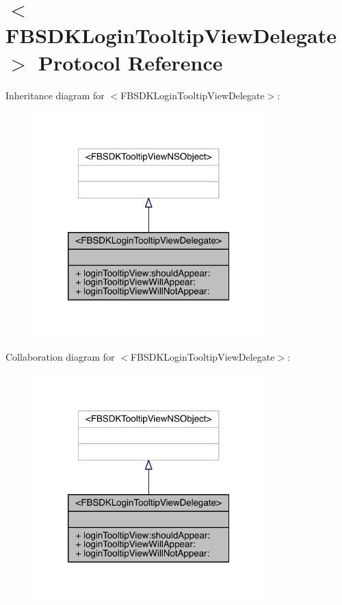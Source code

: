 \hypertarget{protocol_f_b_s_d_k_login_tooltip_view_delegate-p}{\section{$<$F\-B\-S\-D\-K\-Login\-Tooltip\-View\-Delegate$>$ Protocol Reference}
\label{protocol_f_b_s_d_k_login_tooltip_view_delegate-p}
}


Inheritance diagram for $<$F\-B\-S\-D\-K\-Login\-Tooltip\-View\-Delegate$>$\-:
\nopagebreak
\begin{figure}[H]
\begin{center}
\leavevmode
\includegraphics[width=254pt]{protocol_f_b_s_d_k_login_tooltip_view_delegate-p__inherit__graph}
\end{center}
\end{figure}


Collaboration diagram for $<$F\-B\-S\-D\-K\-Login\-Tooltip\-View\-Delegate$>$\-:
\nopagebreak
\begin{figure}[H]
\begin{center}
\leavevmode
\includegraphics[width=254pt]{protocol_f_b_s_d_k_login_tooltip_view_delegate-p__coll__graph}
\end{center}
\end{figure}
